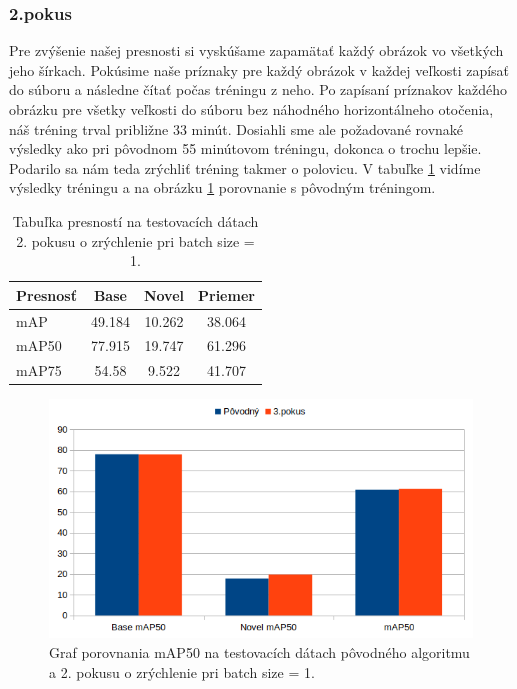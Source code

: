 \subsubsection{2.pokus}
Pre zvýšenie našej presnosti si vyskúšame zapamätať každý obrázok vo všetkých jeho šírkach. Pokúsime naše príznaky pre každý obrázok v každej veľkosti zapísať do súboru a následne čítať počas tréningu z neho. Po zapísaní príznakov každého obrázku pre všetky veľkosti do súboru bez náhodného horizontálneho otočenia, náš tréning trval približne 33 minút. Dosiahli sme ale požadované rovnaké výsledky ako pri pôvodnom 55 minútovom tréningu, dokonca o trochu lepšie. Podarilo sa nám teda zrýchliť tréning takmer o polovicu. V tabuľke \ref{tab:table55} vidíme výsledky tréningu a na obrázku \ref{fig:image15} porovnanie s pôvodným tréningom. 

\begin{table}[H]
\begin{tabular}{|l|c|c|c|}
\hline
\textbf{Presnosť} & \textbf{Base} & \textbf{Novel} & \textbf{Priemer} \\
\hline
mAP & 49.184 & 10.262 & 38.064 \\
mAP50 & 77.915 & 19.747 & 61.296 \\
mAP75 & 54.58 & 9.522 & 41.707 \\
\hline
\end{tabular}
\centering
\caption{Tabuľka presností na testovacích dátach 2. pokusu o zrýchlenie pri batch size = 1.}
\label{tab:table55}
\end{table}

\begin{figure}[H]
\centering
\includegraphics[width=\textwidth]{images/faster_3attempt_chart.png}
\caption{Graf porovnania mAP50 na testovacích dátach pôvodného algoritmu a 2. pokusu o zrýchlenie pri batch size = 1.}
\label{fig:image15}
\end{figure}

